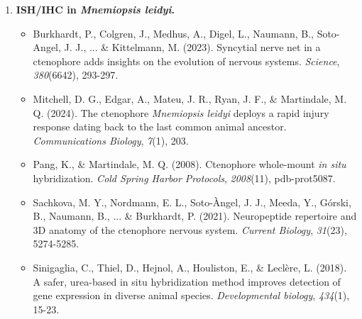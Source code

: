 \documentclass[10pt]{report}
\begin{document}
\begin{enumerate}
	\item \textbf{ISH/IHC in \textit{Mnemiopsis leidyi}.}
		\begin{itemize}
			\item Burkhardt, P., Colgren, J., Medhus, A., Digel, L., Naumann, B., Soto-Angel, J. J., ... \& Kittelmann, M. (2023). Syncytial nerve net in a ctenophore adds insights on the evolution of nervous systems. \textit{Science}, \textit{380}(6642), 293-297. 
			\item Mitchell, D. G., Edgar, A., Mateu, J. R., Ryan, J. F., \&
			Martindale, M. Q. (2024). The ctenophore \textit{Mnemiopsis leidyi} deploys a rapid injury response dating back to the last common animal ancestor. \textit{Communications Biology}, \textit{7}(1), 203. 
			\item Pang, K., \& Martindale, M. Q. (2008). Ctenophore whole-mount \textit{in
			situ} hybridization. \textit{Cold Spring Harbor Protocols}, \textit{2008}(11), pdb-prot5087. 
			\item Sachkova, M. Y., Nordmann, E. L., Soto-Àngel, J. J., Meeda, Y., Górski, B., Naumann, B., ... \& Burkhardt, P. (2021). Neuropeptide repertoire and 3D anatomy of the ctenophore nervous system. \textit{Current Biology}, \textit{31}(23), 5274-5285. 
			\item Sinigaglia, C., Thiel, D., Hejnol, A., Houliston, E., \& Leclère, L.
			(2018). A safer, urea-based in situ hybridization method improves detection
			of gene expression in diverse animal species. \textit{Developmental biology}, \textit{434}(1), 15-23. 
		\end{itemize}
\end{enumerate}
\end{document}
